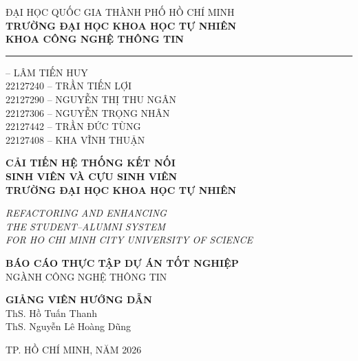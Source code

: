 \documentclass[12pt,a4paper,oneside]{report}
\begin{document}
\thispagestyle{empty}
\begin{center}
{\fontsize{13}{16}\selectfont ĐẠI HỌC QUỐC GIA THÀNH PHỐ HỒ CHÍ MINH}\\[2pt]
{\fontsize{13}{16}\selectfont \textbf{TRƯỜNG ĐẠI HỌC KHOA HỌC TỰ NHIÊN}}\\[2pt]
{\fontsize{13}{16}\selectfont \textbf{KHOA CÔNG NGHỆ THÔNG TIN}}\\[4pt]
\rule{5cm}{0.6pt}

\vspace{1.2cm}
{\fontsize{13}{16} -- LÂM TIẾN HUY \\[3pt]
22127240 -- TRẦN TIẾN LỢI \\[3pt]
22127290 -- NGUYỄN THỊ THU NGÂN \\[3pt]
22127306 -- NGUYỄN TRỌNG NHÂN \\[3pt]
22127442 -- TRẦN ĐỨC TÙNG \\[3pt]
22127408 -- KHA VĨNH THUẬN}

\vspace{1.4cm}
{\fontsize{16}{22}\selectfont\bfseries CẢI TIẾN HỆ THỐNG KẾT NỐI\\[6pt]
SINH VIÊN VÀ CỰU SINH VIÊN\\[6pt]
TRƯỜNG ĐẠI HỌC KHOA HỌC TỰ NHIÊN}

\vspace{0.6cm}
{\fontsize{13}{17}\selectfont\itshape REFACTORING AND ENHANCING\\
THE STUDENT--ALUMNI SYSTEM\\
FOR HO CHI MINH CITY UNIVERSITY OF SCIENCE}

\vspace{1.2cm}
{\fontsize{14}{18}\selectfont\bfseries BÁO CÁO THỰC TẬP DỰ ÁN TỐT NGHIỆP}\\[6pt]
{\fontsize{13}{16}\selectfont NGÀNH CÔNG NGHỆ THÔNG TIN}

\vspace{1.2cm}
{\fontsize{13}{18}\selectfont
\textbf{GIẢNG VIÊN HƯỚNG DẪN}\\[4pt]
ThS. Hồ Tuấn Thanh\\[3pt]
ThS. Nguyễn Lê Hoàng Dũng}

\vfill
{\fontsize{13}{16}\selectfont TP. HỒ CHÍ MINH, NĂM 2026}
\end{center}
\newpage

\setcounter{page}{1}
\end{document}
